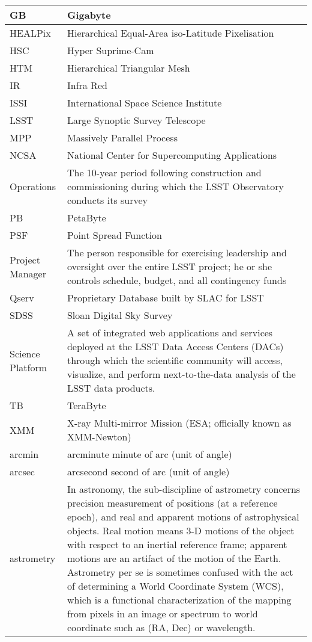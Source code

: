 \begin{longtable}{|l|p{}|}
GB & Gigabyte \\\hline
HEALPix & Hierarchical Equal-Area iso-Latitude Pixelisation \\\hline
HSC & Hyper Suprime-Cam \\\hline
HTM & Hierarchical Triangular Mesh \\\hline
IR & Infra Red \\\hline
ISSI & International Space Science Institute \\\hline
LSST & Large Synoptic Survey Telescope \\\hline
MPP & Massively Parallel Process \\\hline
NCSA & National Center for Supercomputing Applications \\\hline
Operations & The 10-year period following construction and commissioning during which the LSST Observatory conducts its survey \\\hline
PB & PetaByte \\\hline
PSF & Point Spread Function \\\hline
Project Manager & The person responsible for exercising leadership and oversight over the entire LSST project; he or she controls schedule, budget, and all contingency funds \\\hline
Qserv & Proprietary Database built by SLAC for LSST \\\hline
SDSS & Sloan Digital Sky Survey \\\hline
Science Platform & A set of integrated web applications and services deployed at the LSST Data Access Centers (DACs) through which the scientific community will access, visualize, and perform next-to-the-data analysis of the LSST data products. \\\hline
TB & TeraByte \\\hline
XMM & X-ray Multi-mirror Mission (ESA; officially known as XMM-Newton) \\\hline
arcmin & arcminute minute of arc (unit of angle) \\\hline
arcsec & arcsecond second of arc (unit of angle) \\\hline
astrometry & In astronomy, the sub-discipline of astrometry concerns precision measurement of positions (at a reference epoch), and real and apparent motions of astrophysical objects. Real motion means 3-D motions of the object with respect to an inertial reference frame; apparent motions are an artifact of the motion of the Earth. Astrometry per se is sometimes confused with the act of determining a World Coordinate System (WCS), which is a functional characterization of the mapping from pixels in an image or spectrum to world coordinate such as (RA, Dec) or wavelength. \\\hline

\end{longtable}
